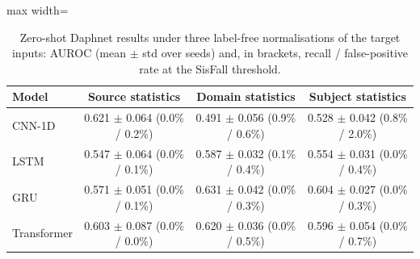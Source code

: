 \begin{table}[ht]
\centering
\footnotesize
\caption{Zero-shot Daphnet results under three label-free normalisations of the target inputs: AUROC (mean $\pm$ std over seeds) and, in brackets, recall / false-positive rate at the SisFall threshold.}
\label{tab:ablation}
\begin{adjustbox}{max width=\textwidth}
\begin{tabular}{lccc}
\toprule
Model & Source statistics & Domain statistics & Subject statistics \\
\midrule
CNN-1D & 0.621 $\pm$ 0.064 (0.0\% / 0.2\%) & 0.491 $\pm$ 0.056 (0.9\% / 0.6\%) & 0.528 $\pm$ 0.042 (0.8\% / 2.0\%) \\
LSTM & 0.547 $\pm$ 0.064 (0.0\% / 0.1\%) & 0.587 $\pm$ 0.032 (0.1\% / 0.4\%) & 0.554 $\pm$ 0.031 (0.0\% / 0.4\%) \\
GRU & 0.571 $\pm$ 0.051 (0.0\% / 0.1\%) & 0.631 $\pm$ 0.042 (0.0\% / 0.3\%) & 0.604 $\pm$ 0.027 (0.0\% / 0.3\%) \\
Transformer & 0.603 $\pm$ 0.087 (0.0\% / 0.0\%) & 0.620 $\pm$ 0.036 (0.0\% / 0.5\%) & 0.596 $\pm$ 0.054 (0.0\% / 0.7\%) \\
\bottomrule
\end{tabular}
\end{adjustbox}
\end{table}